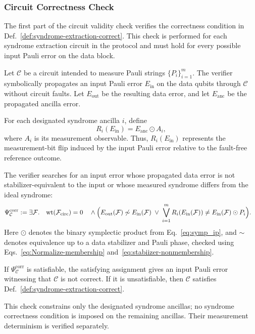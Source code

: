 \documentclass[acmsmall,screen,review,anonymous,nonacm]{acmart}
\newcommand{\cC}{\mathcal{C}}
\begin{document}
\subsubsection{Circuit Correctness Check}
\label{subsec:circuit-correctness-check}

The first part of the circuit validity check verifies
the correctness condition in
Def.~\ref{def:syndrome-extraction-correct}.
This check is performed for each syndrome extraction
circuit in the protocol and must hold for every
possible input Pauli error on the data block.

Let $\cC$ be a circuit intended to measure
Pauli strings $\{P_i\}_{i=1}^{m}$.
The verifier symbolically propagates an input
Pauli error $E_{\mathrm{in}}$ on the data qubits
through $\cC$ without circuit faults.
Let $E_{\mathrm{out}}$ be the resulting data error,
and let $E_{\mathrm{anc}}$ be the propagated
ancilla error.

For each designated syndrome ancilla $i$, define
\[
    R_i(E_{\mathrm{in}})
    =E_{\mathrm{anc}}\odot A_i,
\]
where $A_i$ is its measurement observable.
Thus, $R_i(E_{\mathrm{in}})$ represents the
measurement-bit flip induced by the input Pauli
error relative to the fault-free reference outcome.

The verifier searches for an input error whose propagated data error
is not stabilizer-equivalent to the input or whose measured syndrome
differs from the ideal syndrome:
\begin{equation}
\begin{aligned}
\Psi^{\mathrm{corr}}_{\cC}
:=
\exists \mathcal{F}. \quad \mathrm{wt}(\mathcal{F}_{\mathrm{circ}}) = 0 
\quad & 
 \land \Bigl(
E_{\mathrm{out}}(\mathcal{F})\not\sim E_{\mathrm{in}}(\mathcal{F})
\;\vee\;
\bigvee_{i=1}^{m}
R_i(E_{\mathrm{in}}(\mathcal{F}))
\neq
E_{\mathrm{in}}(\mathcal{F})\odot P_i
\Bigr).
\end{aligned}
\end{equation}
Here $\odot$ denotes the binary symplectic
product from Eq.~\ref{eq:symp_ip}, and $\sim$
denotes equivalence up to a data stabilizer and Pauli phase,
checked using Eqs.~\ref{eq:Normalize-membership}
and~\ref{eq:stabiizer-nonmembership}.

If $\Psi^{\mathrm{corr}}_{\cC}$ is satisfiable,
the satisfying assignment gives an input
Pauli error witnessing that $\cC$ is not
correct. If it is unsatisfiable, then
$\cC$ satisfies
Def.~\ref{def:syndrome-extraction-correct}.

This check constrains only the designated
syndrome ancillas; no syndrome correctness
condition is imposed on the remaining ancillas.
Their measurement determinism is verified
separately.
\end{document}
